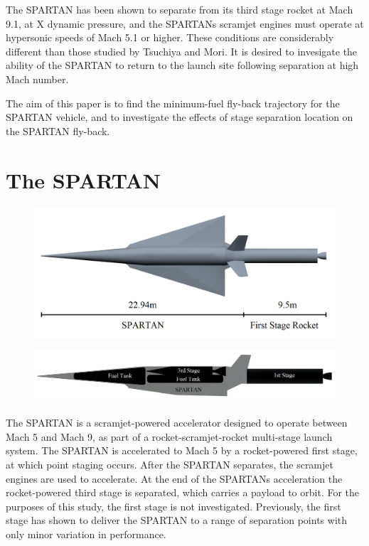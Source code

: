 \documentclass[conf]{new-aiaa}
\begin{document}
The SPARTAN has been shown to separate from its third stage rocket at Mach 9.1, at X dynamic pressure, and the SPARTANs scramjet engines must operate at hypersonic speeds of Mach 5.1 or higher. These conditions are considerably different than those studied by Tsuchiya and Mori. It is desired to invesigate the ability of the SPARTAN to return to the launch site following separation at high Mach number. 

The aim of this paper is to find the minimum-fuel fly-back trajectory for the SPARTAN vehicle, and to investigate the effects of stage separation location on the SPARTAN fly-back. 



\section{The SPARTAN}



\begin{figure}
\centering
\includegraphics[width=0.7\linewidth]{Figures/NoInternal}
\caption{}
\label{fig:NoInternal}
\end{figure}
\begin{figure}
\centering
\includegraphics[width=0.7\linewidth]{Figures/INTERNALS}
\caption{}
\label{fig:INTERNALS}
\end{figure}


The SPARTAN is a scramjet-powered accelerator designed to operate between Mach 5 and Mach 9, as part of a rocket-scramjet-rocket multi-stage launch system. The SPARTAN is accelerated to Mach 5 by a rocket-powered first stage, at which point staging occurs. After the SPARTAN separates, the scramjet engines are used to accelerate. At the end of the SPARTANs acceleration the rocket-powered third stage is separated, which carries a payload to orbit. For the purposes of this study, the first stage is not investigated. Previously, the first stage has shown to deliver the SPARTAN to a range of separation points with only minor variation in performance. 
\end{document}
